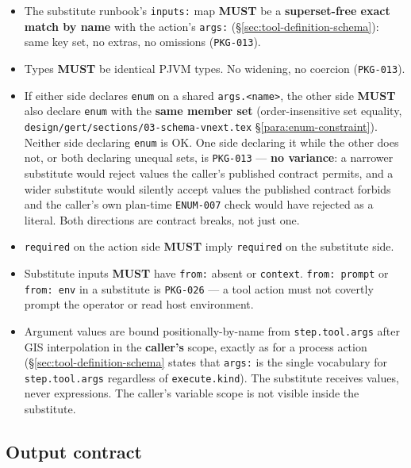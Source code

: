 \begin{itemize}
  \item The substitute runbook's \texttt{inputs:} map \textbf{MUST} be a
        \textbf{superset-free exact match by name} with the action's
        \texttt{args:} (\S\ref{sec:tool-definition-schema}): same key set, no
        extras, no omissions (\texttt{PKG-013}).
  \item Types \textbf{MUST} be identical PJVM types. No widening, no
        coercion (\texttt{PKG-013}).
  \item If either side declares \texttt{enum} on a shared \texttt{args.<name>},
        the other side \textbf{MUST} also declare \texttt{enum} with the
        \textbf{same member set} (order-insensitive set equality,
        \texttt{design/gert/sections/03-schema-vnext.tex} \S\ref{para:enum-constraint}).
        Neither side declaring \texttt{enum} is OK. One side declaring it
        while the other does not, or both declaring unequal sets, is
        \texttt{PKG-013} --- \textbf{no variance}: a narrower substitute
        would reject values the caller's published contract permits, and a
        wider substitute would silently accept values the published
        contract forbids and the caller's own plan-time \texttt{ENUM-007}
        check would have rejected as a literal. Both directions are
        contract breaks, not just one.
  \item \texttt{required} on the action side \textbf{MUST} imply
        \texttt{required} on the substitute side.
  \item Substitute inputs \textbf{MUST} have \texttt{from:} absent or
        \texttt{context}. \texttt{from: prompt} or \texttt{from: env} in a
        substitute is \texttt{PKG-026} --- a tool action must not covertly
        prompt the operator or read host environment.
  \item Argument values are bound positionally-by-name from
        \texttt{step.tool.args} after GIS interpolation in the
        \textbf{caller's} scope, exactly as for a process action
        (\S\ref{sec:tool-definition-schema} states that \texttt{args:} is
        the single vocabulary for \texttt{step.tool.args} regardless of
        \texttt{execute.kind}). The substitute receives values, never
        expressions. The caller's variable scope is not visible inside the
        substitute.
\end{itemize}

\subsection{Output contract}
\label{sec:tool-substitution-outputs}

